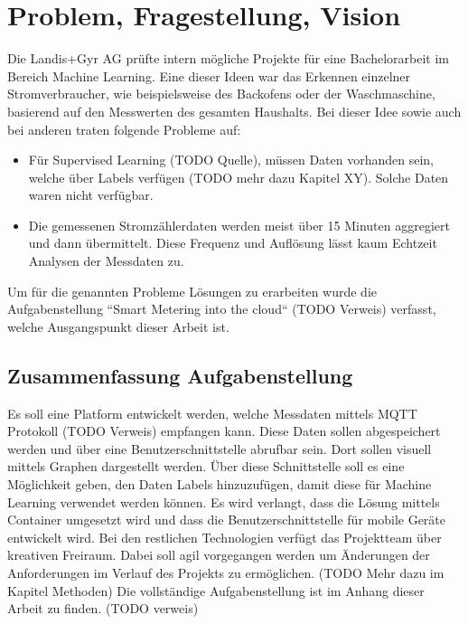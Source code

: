 \chapter{Problem, Fragestellung, Vision}

Die Landis+Gyr AG prüfte intern mögliche Projekte für eine Bachelorarbeit im Bereich Machine Learning.
Eine dieser Ideen war das Erkennen einzelner Stromverbraucher, wie beispielsweise des Backofens oder der Waschmaschine,
basierend auf den Messwerten des gesamten Haushalts.
Bei dieser Idee sowie auch bei anderen traten folgende Probleme auf:
\begin{itemize}
    \item Für Supervised Learning (TODO Quelle), müssen Daten vorhanden sein, 
          welche über Labels verfügen (TODO mehr dazu Kapitel XY).
          Solche Daten waren nicht verfügbar.
    \item Die gemessenen Stromzählerdaten werden meist über 15 Minuten aggregiert und dann übermittelt.
          Diese Frequenz und Auflösung lässt kaum Echtzeit Analysen der Messdaten zu.

\end{itemize}

Um für die genannten Probleme Lösungen zu erarbeiten wurde die Aufgabenstellung ``Smart Metering into the cloud`` (TODO Verweis) verfasst,
welche Ausgangspunkt dieser Arbeit ist.

\section{Zusammenfassung Aufgabenstellung}
Es soll eine Platform entwickelt werden, welche Messdaten mittels MQTT Protokoll (TODO Verweis) empfangen kann.
Diese Daten sollen abgespeichert werden und über eine Benutzerschnittstelle abrufbar sein. Dort sollen visuell mittels Graphen dargestellt werden.
Über diese Schnittstelle soll es eine Möglichkeit geben, den Daten Labels hinzuzufügen, damit diese für Machine Learning verwendet werden können.
Es wird verlangt, dass die Lösung mittels Container umgesetzt wird und dass die Benutzerschnittstelle für mobile Geräte entwickelt wird.
Bei den restlichen Technologien verfügt das Projektteam über kreativen Freiraum. %
Dabei soll agil vorgegangen werden um Änderungen der Anforderungen im Verlauf des Projekts zu ermöglichen. (TODO Mehr dazu im Kapitel Methoden)
Die vollständige Aufgabenstellung ist im Anhang dieser Arbeit zu finden. (TODO verweis)

